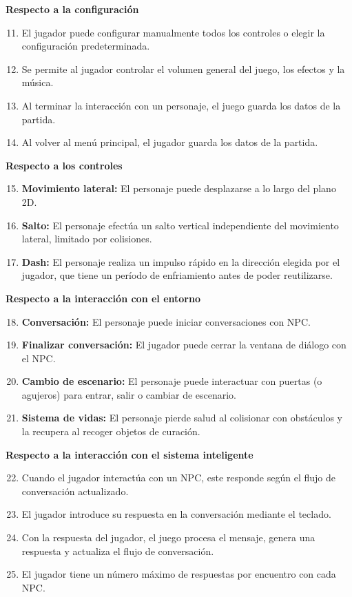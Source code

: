 \documentclass[12pt,twoside]{article}
\begin{document}
	\noindent\textbf{Respecto a la configuración}
	\begin{enumerate}[label=RF\arabic*]
		\setcounter{enumi}{10}
		\item El jugador puede configurar manualmente todos los controles o elegir la configuración predeterminada.
		\item Se permite al jugador controlar el volumen general del juego, los efectos y la música.
		\item Al terminar la interacción con un personaje, el juego guarda los datos de la partida.
		\item Al volver al menú principal, el jugador guarda los datos de la partida.
	\end{enumerate}
	
	\noindent\textbf{Respecto a los controles}
	\begin{enumerate}[label=RF\arabic*]
		\setcounter{enumi}{14}
		\item \textbf{Movimiento lateral: }El personaje puede desplazarse a lo largo del plano 2D.
		\item \textbf{Salto: }El personaje efectúa un salto vertical independiente del movimiento lateral, limitado por colisiones.
		\item \textbf{Dash: }El personaje realiza un impulso rápido en la dirección elegida por el jugador, que tiene un período de enfriamiento antes de poder reutilizarse.
	\end{enumerate}
	
	\noindent\textbf{Respecto a la interacción con el entorno}
	\begin{enumerate}[label=RF\arabic*]
		\setcounter{enumi}{17}
		\item \textbf{Conversación: }El personaje puede iniciar conversaciones con NPC.
		\item \textbf{Finalizar conversación:} El jugador puede cerrar la ventana de diálogo con el NPC.
		\item \textbf{Cambio de escenario: }El personaje puede interactuar con puertas (o agujeros) para entrar, salir o cambiar de escenario.
		\item \textbf{Sistema de vidas: }El personaje pierde salud al colisionar con obstáculos y la recupera al recoger objetos de curación.
	\end{enumerate}
	
	\noindent\textbf{Respecto a la interacción con el sistema inteligente}
	\begin{enumerate}[label=RF\arabic*]
		\setcounter{enumi}{21}
		\item Cuando el jugador interactúa con un NPC, este responde según el flujo de conversación actualizado.
		\item El jugador introduce su respuesta en la conversación mediante el teclado.
		\item Con la respuesta del jugador, el juego procesa el mensaje, genera una respuesta y actualiza el flujo de conversación.
		\item El jugador tiene un número máximo de respuestas por encuentro con cada NPC.
		
	\end{enumerate}
	
\end{document}
